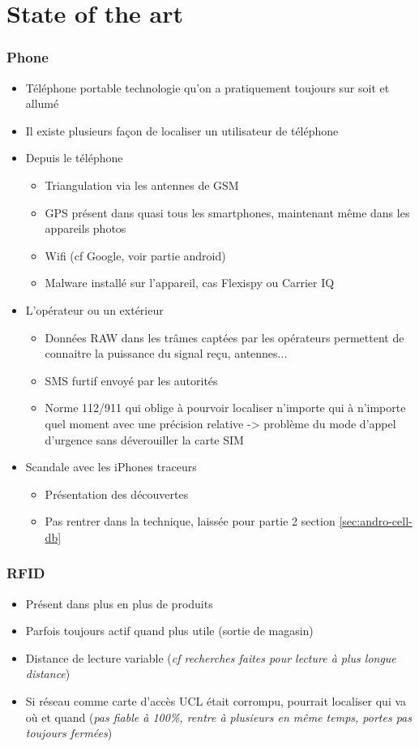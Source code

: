 \part{State of the art}
\label{chap:general}

\section*{Phone}
\begin{itemize}
\item Téléphone portable technologie qu'on a pratiquement toujours sur soit et allumé
\item Il existe plusieurs façon de localiser un utilisateur de téléphone
\item Depuis le téléphone
  \begin{itemize}
  \item Triangulation via les antennes de GSM
  \item GPS présent dans quasi tous les smartphones, maintenant même dans les appareils photos
  \item Wifi (cf Google, voir partie android)
  \item Malware installé sur l'appareil, cas Flexispy ou Carrier IQ
  \end{itemize}
\item L'opérateur ou un extérieur
  \begin{itemize}
  \item Données RAW dans les trâmes captées par les opérateurs permettent de connaitre la puissance du signal reçu, antennes...
  \item SMS furtif envoyé par les autorités
  \item Norme 112/911 qui oblige à pourvoir localiser n'importe qui à n'importe quel moment avec une précision relative -> problème du mode d'appel d'urgence sans déverouiller la carte SIM
  \end{itemize}
\item Scandale avec les iPhones traceurs
  \begin{itemize}
  \item Présentation des découvertes
  \item Pas rentrer dans la technique, laissée pour partie 2 section \ref{sec:andro-cell-db}
  \end{itemize}
\end{itemize}

\section*{RFID}
\begin{itemize}
\item Présent dans plus en plus de produits
\item Parfois toujours actif quand plus utile (sortie de magasin)
\item Distance de lecture variable (\emph{cf recherches faites pour lecture à plus longue distance})
\item Si réseau comme carte d'accès UCL était corrompu, pourrait localiser qui va où et quand (\emph{pas fiable à 100\%, rentre à plusieurs en même temps, portes pas toujours fermées})
\end{itemize}

